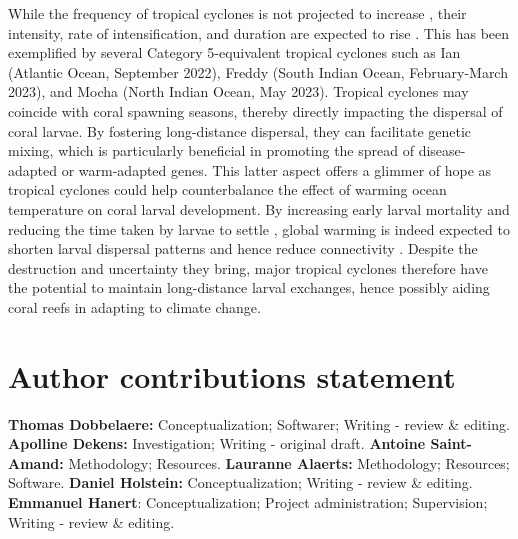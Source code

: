 \documentclass[fleqn,10pt]{wlscirep}
\newcommand{\emphc}[1]{\emph{\textcolor{red}{#1}}}
\newcommand{\modif}[1]{{#1}}
\begin{document}
While the frequency of tropical cyclones is not projected to increase \citep{walsh2019tropical}, their intensity, rate of intensification, and duration are expected to rise \citep{bhatia2022potential}. This has been exemplified by several Category 5-equivalent tropical cyclones such as Ian (Atlantic Ocean, September 2022), Freddy (South Indian Ocean, February-March 2023), and Mocha (North Indian Ocean, May 2023). Tropical cyclones \modif{may} coincide with coral spawning seasons, thereby directly impacting the dispersal of coral larvae. By fostering long-distance dispersal, they can facilitate genetic mixing, which is particularly beneficial in promoting the spread of disease-adapted or warm-adapted genes. This latter aspect offers a glimmer of hope as tropical cyclones could help counterbalance the effect of warming ocean temperature on coral larval development. By increasing early larval mortality and reducing the time taken by larvae to settle \citep{nozawa2007effects, heyward2010plasticity}, global warming is indeed expected to shorten larval dispersal patterns and hence reduce connectivity \citep{Figueiredo2022Jan}. Despite the destruction and uncertainty they bring, major tropical cyclones therefore have the potential to maintain long-distance larval exchanges, hence possibly aiding coral reefs in adapting to climate change.

\section*{Author contributions statement}
\textbf{Thomas Dobbelaere:} Conceptualization; Softwarer; Writing - review \& editing. \textbf{Apolline Dekens:} Investigation; Writing - original draft. \textbf{Antoine Saint-Amand:} Methodology; Resources. \textbf{Lauranne Alaerts:} Methodology; Resources; Software. \textbf{Daniel Holstein:} Conceptualization; Writing - review \& editing. \textbf{Emmanuel Hanert}: Conceptualization; Project administration; Supervision; Writing - review \& editing.

\end{document}
